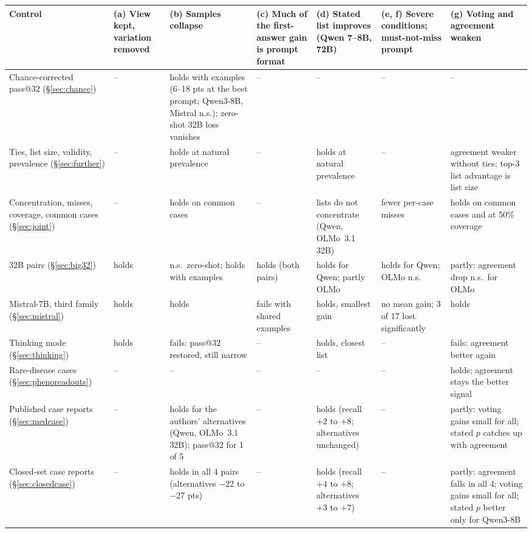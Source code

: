 \documentclass[wcp]{jmlr}
\begin{document}
\begin{table}[p]
\centering\tiny
\setlength{\tabcolsep}{2.5pt}
\renewcommand{\arraystretch}{1.05}
\begin{tabular}{L{2.2cm}L{1.7cm}L{2.0cm}L{1.8cm}L{2.0cm}L{2.3cm}L{1.9cm}}
\toprule
Control & (a) View kept, variation removed & (b) Samples collapse & (c) Much of the first-answer gain is prompt format & (d) Stated list improves (Qwen 7--8B, 72B) & (e, f) Severe conditions; must-not-miss prompt & (g) Voting and agreement weaken \\
\midrule
Chance-corrected pass@32 (\S\ref{sec:chance}) & -- & holds with examples (6--18 pts at the best prompt; Qwen3-8B, Mistral n.s.); zero-shot 32B loss vanishes & -- & -- & -- & -- \\
Ties, list size, validity, prevalence (\S\ref{sec:further}) & -- & holds at natural prevalence & -- & holds at natural prevalence & -- & agreement weaker without ties; top-3 list advantage is list size \\
Concentration, misses, coverage, common cases (\S\ref{sec:joint}) & -- & holds on common cases & -- & lists do not concentrate (Qwen, OLMo~3.1 32B) & fewer per-case misses & holds on common cases and at 50\% coverage \\
32B pairs (\S\ref{sec:big32}) & holds & n.s.\ zero-shot; holds with examples & holds (both pairs) & holds for Qwen; partly OLMo & holds for Qwen; OLMo n.s. & partly: agreement drop n.s.\ for OLMo \\
Mistral-7B, third family (\S\ref{sec:mistral}) & holds & holds & fails with shared examples & holds, smallest gain & no mean gain; 3 of 17 lost significantly & holds \\
Thinking mode (\S\ref{sec:thinking}) & holds & fails: pass@32 restored, still narrow & -- & holds, closest list & -- & fails: agreement better again \\
Rare-disease cases (\S\ref{sec:phenoreadouts}) & -- & -- & -- & -- & -- & holds; agreement stays the better signal \\
Published case reports (\S\ref{sec:medcase}) & -- & holds for the authors' alternatives (Qwen, OLMo~3.1 32B); pass@32 for 1 of 5 & -- & holds (recall $+2$ to $+8$; alternatives unchanged) & -- & partly: voting gains small for all; stated $p$ catches up with agreement \\
Closed-set case reports (\S\ref{sec:closedcase}) & -- & holds in all 4 pairs (alternatives $-22$ to $-27$ pts) & -- & holds (recall $+4$ to $+8$; alternatives $+3$ to $+7$) & -- & partly: agreement falls in all 4; voting gains small for all; stated $p$ better only for Qwen3-8B \\

\end{tabular}
\end{table}
\end{document}

